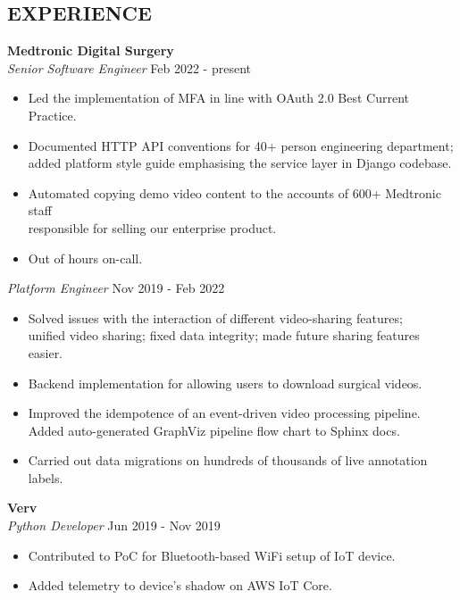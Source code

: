 \documentclass[line,margin]{res}
\begin{document}
\begin{resume}
\section{EXPERIENCE} \textbf{Medtronic Digital Surgery} \\
                {\sl Senior Software Engineer} \hfill   Feb 2022 - present \\
                 \begin{itemize}  \itemsep  -0pt %
                   \item Led the implementation of MFA in line with OAuth 2.0 Best Current Practice.
                   \item Documented HTTP API conventions for 40+ person engineering department; \\
		         added platform style guide emphasising the service layer in Django codebase.
                   \item Automated copying demo video content to the accounts of 600+ Medtronic staff \\
                         responsible for selling our enterprise product.
                   \item Out of hours on-call.
                 \end{itemize}
                {\sl Platform Engineer} \hfill          Nov 2019 - Feb 2022 \\
                  \begin{itemize}  \itemsep -0pt %
                  \item Solved issues with the interaction of different video-sharing features; \\
                        unified video sharing; fixed data integrity; made future sharing features easier.
                  \item Backend implementation for allowing users to download surgical videos.
                  \item Improved the idempotence of an event-driven video processing pipeline. \\
                        Added auto-generated GraphViz pipeline flow chart to Sphinx docs.
                  \item Carried out data migrations on hundreds of thousands of live annotation labels.
                  \end{itemize}

                \textbf{Verv} \\
                {\sl Python Developer} \hfill        Jun 2019 - Nov 2019 \\
                  \begin{itemize} \itemsep -0pt %
                  \item Contributed to PoC for Bluetooth-based WiFi setup of IoT device.\
                  \item Added telemetry to device's shadow on AWS IoT Core.
                  \end{itemize}


\end{resume}
\end{document}

